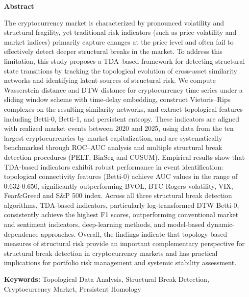 \documentclass[11pt,reqno]{amsart}
\numberwithin{equation}{section} %
\begin{document}
\begin{center}
\textbf{Abstract}
\end{center}
The cryptocurrency market is characterized by pronounced volatility and structural fragility, yet traditional risk indicators (such as price volatility and market indices) primarily capture changes at the price level and often fail to effectively detect deeper structural breaks in the market. 
To address this limitation, this study proposes a TDA–based framework for detecting structural state transitions by tracking the topological evolution of cross-asset similarity networks and identifying latent sources of structural risk. 
We compute Wasserstein distance and DTW distance for cryptocurrency time series under a sliding window scheme with time-delay embedding, construct Vietoris–Rips complexes on the resulting similarity networks, and extract topological features including Betti-0, Betti-1, and persistent entropy. 
These indicators are aligned with realized market events between 2020 and 2025, using data from the ten largest cryptocurrencies by market capitalization, and are systematically benchmarked through ROC–AUC analysis and multiple structural break detection procedures (PELT, BinSeg and CUSUM).
Empirical results show that TDA-based indicators exhibit robust performance in event identification: topological connectivity features (Betti-0) achieve AUC values in the range of 0.632-0.650, significantly outperforming BVOL, BTC Rogers volatility, VIX, Fear\&Greed and S\&P 500 index. 
Across all three structural break detection algorithms, TDA-based indicators, particularly log-transformed DTW Betti-0, consistently achieve the highest F1 scores, outperforming conventional market and sentiment indicators, deep-learning methods, and model-based dynamic-dependence approaches.
Overall, the findings indicate that topology-based measures of structural risk provide an important complementary perspective for structural break detection in cryptocurrency markets and has practical implications for portfolio risk management and systemic stability assessment.

\noindent\textbf{Keywords:} Topological Data Analysis, Structural Break Detection, Cryptocurrency Market, Persistent Homology
\vspace{1em}


\newpage
\end{document}
